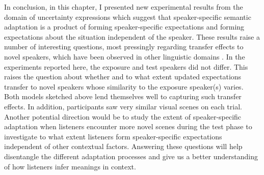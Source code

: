 In conclusion, in this chapter, I presented new experimental results from the domain of uncertainty expressions which suggest that speaker-specific semantic adaptation
is a product of forming speaker-specific expectations and forming expectations about the situation independent of the
speaker.
These results raise a number of interesting questions, most pressingly regarding transfer effects to novel speakers, which 
have been observed in other linguistic domains . In the experiments reported here, the exposure and test speakers
did not differ. This raises the question about whether and to what extent updated expectations transfer to novel speakers whose similarity to the exposure speaker(s) varies.
Both models sketched above lend themselves well to capturing such transfer effects.
In addition, participants saw very similar visual scenes on each trial. Another potential direction would be to study the 
extent of speaker-specific adaptation when listeners encounter more novel scenes during the test phase to investigate to what extent
listeners form speaker-specific expectations independent of other contextual factors.
Answering these
questions will help disentangle the different adaptation processes and give us a better understanding
of how listeners infer meanings in context.

